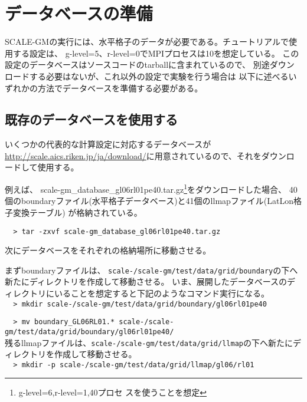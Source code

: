 \section{データベースの準備}

SCALE-GMの実行には、水平格子のデータが必要である。チュートリアルで使用する設定は、
g-level=5、r-level=0でMPIプロセスは10を想定している。
この設定のデータベースはソースコードのtarballに含まれているので、
別途ダウンロードする必要はないが、これ以外の設定で実験を行う場合は
以下に述べるいずれかの方法でデータベースを準備する必要がある。
\subsection{既存のデータベースを使用する}
いくつかの代表的な計算設定に対応するデータベースが\noindent \url{http://scale.aics.riken.jp/ja/download/}に用意されているので、それをダウンロードして使用する。

例えば、
scale-gm\_database\_gl06rl01pe40.tar.gz\footnote{g-level=6,r-level=1,40プロセ
  スを使うことを想定}をダウンロードした場合、
40個のboundaryファイル(水平格子データベース)と41個のllmapファイル(LatLon格子変換テーブル)
が格納されている。
\begin{verbatim}
  > tar -zxvf scale-gm_database_gl06rl01pe40.tar.gz
\end{verbatim}

\noindent 次にデータベースをそれぞれの格納場所に移動させる。

\noindent まずboundaryファイルは、
\texttt{scale-{\version}/scale-gm/test/data/grid/boundary}の下へ新たにディレクトリを作成して移動させる。
いま、展開したデータベースのディレクトリにいることを想定すると下記のようなコマンド実行になる。
\\

\verb|  > mkdir scale-|{\version}\verb|/scale-gm/test/data/grid/boundary/gl06rl01pe40|

\verb|  > mv boundary_GL06RL01.* scale-|{\version}\verb|/scale-gm/test/data/grid/boundary/gl06rl01pe40/|
\\

\noindent 残るllmapファイルは、\texttt{scale-{\version}/scale-gm/test/data/grid/llmap}の下へ新たにディレクトリを作成して移動させる。\\

\verb|  > mkdir -p scale-|{\version}\verb|/scale-gm/test/data/grid/llmap/gl06/rl01|

